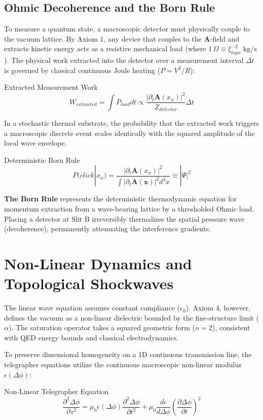\subsection{Ohmic Decoherence and the Born Rule}
To measure a quantum state, a macroscopic detector must physically couple to the vacuum lattice. By Axiom 1, any device that couples to the $\mathbf{A}$-field and extracts kinetic energy acts as a resistive mechanical load (where $1 \, \Omega \equiv \xi_{topo}^{-2} \text{ kg/s}$). The physical work extracted into the detector over a measurement interval $\Delta t$ is governed by classical continuous Joule heating ($P = V^2 / R$):
\begin{resultbox}{Extracted Measurement Work}
\begin{equation}
    W_{extracted} = \int P_{load} dt \propto \frac{|\partial_t \mathbf{A}(x_n)|^2}{Z_{detector}} \Delta t
\end{equation}
\end{resultbox}

In a stochastic thermal substrate, the probability that the extracted work triggers a macroscopic discrete event scales identically with the squared amplitude of the local wave envelope.
\begin{resultbox}{Deterministic Born Rule}
\begin{equation}
    P(click | x_n) = \frac{|\partial_t \mathbf{A}(x_n)|^2}{\int |\partial_t \mathbf{A}(\mathbf{x})|^2 d^3x} \equiv |\Psi|^2
\end{equation}
\end{resultbox}
\textbf{The Born Rule} represents the deterministic thermodynamic equation for momentum extraction from a wave-bearing lattice by a thresholded Ohmic load. Placing a detector at Slit B irreversibly thermalizes the spatial pressure wave (decoherence), permanently attenuating the interference gradients.

\section{Non-Linear Dynamics and Topological Shockwaves}
The linear wave equation assumes constant compliance ($\epsilon_0$). Axiom 4, however, defines the vacuum as a non-linear dielectric bounded by the fine-structure limit ($\alpha$). The saturation operator takes a squared geometric form ($n=2$), consistent with QED energy bounds and classical electrodynamics.

To preserve dimensional homogeneity on a 1D continuous transmission line, the telegrapher equations utilize the continuous macroscopic non-linear modulus $\epsilon(\Delta\phi)$:
\begin{resultbox}{Non-Linear Telegrapher Equation}
\begin{equation}
\label{eq:nonlinear_wave}
    \frac{\partial^{2}\Delta\phi}{\partial z^{2}} = \mu_0 \epsilon(\Delta\phi)\frac{\partial^{2}\Delta\phi}{\partial t^{2}} + \mu_0 \frac{d\epsilon}{d\Delta\phi}\left(\frac{\partial \Delta\phi}{\partial t}\right)^{2}
\end{equation}
\end{resultbox}

